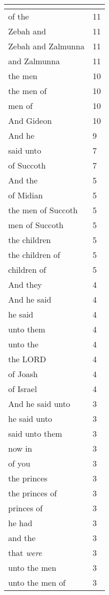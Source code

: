 \begin{center}
\begin{longtable}{|p{3.0in}|p{0.5in}|}
\hline \multicolumn{2}{c}{{ }} \\ \hline
\endfoot 
of the & 11\\ \hline 
Zebah and & 11\\ \hline 
Zebah and Zalmunna & 11\\ \hline 
and Zalmunna & 11\\ \hline 
the men & 10\\ \hline 
the men of & 10\\ \hline 
men of & 10\\ \hline 
And Gideon & 10\\ \hline 
And he & 9\\ \hline 
said unto & 7\\ \hline 
of Succoth & 7\\ \hline 
And the & 5\\ \hline 
of Midian & 5\\ \hline 
the men of Succoth & 5\\ \hline 
men of Succoth & 5\\ \hline 
the children & 5\\ \hline 
the children of & 5\\ \hline 
children of & 5\\ \hline 
And they & 4\\ \hline 
And he said & 4\\ \hline 
he said & 4\\ \hline 
unto them & 4\\ \hline 
unto the & 4\\ \hline 
the LORD & 4\\ \hline 
of Joash & 4\\ \hline 
of Israel & 4\\ \hline 
And he said unto & 3\\ \hline 
he said unto & 3\\ \hline 
said unto them & 3\\ \hline 
now in & 3\\ \hline 
of you & 3\\ \hline 
the princes & 3\\ \hline 
the princes of & 3\\ \hline 
princes of & 3\\ \hline 
he had & 3\\ \hline 
and the & 3\\ \hline 
that \emph{were} & 3\\ \hline 
unto the men & 3\\ \hline 
unto the men of & 3\\ \hline 

\end{longtable}
\end{center}
